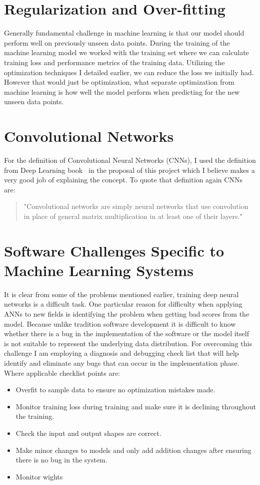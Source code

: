 \section{Regularization and Over-fitting} \label{sec:regularization}
Generally fundamental challenge in machine learning is that our model should perform well on previously unseen data points.
During the training of the machine learning model we worked with the training set where we can calculate training loss and performance metrics of the training data. 
Utilizing the optimization techniques I detailed earlier, we can reduce the loss we initially had. 
However that would just be optimization, what separate optimization from machine learning is how well the model perform when predicting for the new unseen data points. 


\section{Convolutional Networks} \label{sec:convnets}
For the definition of Convolutional Neural Networks (CNNs), I used the definition from Deep Learning book~\cite{deeplearningbook} in the proposal of this project which I believe makes a very good job of explaining the concept. 
To quote that definition again CNNs are:
\begin{quote}
  "Convolutional networks are simply neural networks that use convolution in place of general matrix multiplication in at least one of their layers."
\end{quote}

\section{Software Challenges Specific to 
Machine Learning Systems} \label{sec:engchallenge}
It is clear from some of the problems mentioned earlier, training deep neural networks is a difficult task. 
One particular reason for difficulty when applying ANNs to new fields is identifying the problem when getting bad scores from the model. 
Because unlike tradition software development it is difficult to know whether there is a bug in the implementation of the software or the model itself is not suitable to represent the underlying data distribution.
For overcoming this challenge I am employing a diagnosis and debugging check list that will help identify and eliminate any bugs that can occur in the implementation phase.
Where applicable checklist points are:

\begin{itemize}
  \item Overfit to sample data to ensure no optimization mistakes made.
  \item Monitor training loss during training and make sure it is declining throughout the training.
  \item Check the input and output shapes are correct.
  \item Make minor changes to models and only add addition changes after ensuring there is no bug in the system.
  \item Monitor wights 
\end{itemize}

